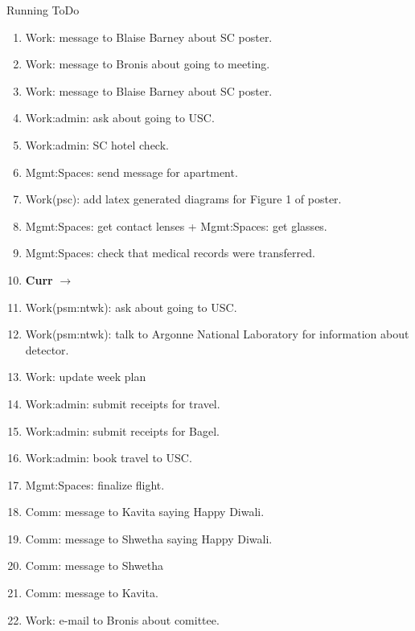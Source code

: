 \begin{columns}
\begin{column}{0.6\linewidth}
\begin{block}{Running ToDo}
\begin{enumerate}
  \item \tiny Work: message to Blaise Barney about SC poster. 
  \item \tiny Work: message to Bronis about going to meeting. 
  \item \tiny Work: message to Blaise Barney about SC poster. 

  \item \tiny Work:admin: ask about going to USC. 
  \item \tiny Work:admin: SC hotel check. 
     
  \item \tiny Mgmt:Spaces: send message for apartment. 

  \item \tiny Work(psc): add latex generated diagrams for Figure 1 of
    poster.

  \item \tiny Mgmt:Spaces: get contact lenses + Mgmt:Spaces: get glasses.    
  \item \tiny Mgmt:Spaces: check that medical records were
    transferred. 

  \item \tiny \textbf{Curr} $\rightarrow$ 
  \item \tiny Work(psm:ntwk): ask about going to USC. 
  \item \tiny Work(psm:ntwk): talk to Argonne National Laboratory
    for information about detector.


\item \tiny Work: update week plan 

    \item \tiny Work:admin: submit receipts for travel. 
    
    \item \tiny Work:admin: submit receipts for Bagel. 
    
    \item \tiny Work:admin: book travel to USC. 
    

  \item \tiny Mgmt:Spaces: finalize flight. 
    \item \tiny Comm: message to Kavita saying Happy Diwali. 
    \item \tiny Comm: message to Shwetha saying Happy Diwali. 
    \item \tiny Comm: message to Shwetha 
    \item \tiny Comm: message to Kavita.
  \item \tiny Work: e-mail to Bronis about comittee. 
    

\end{enumerate}
\end{block}
\end{column}
\end{columns}

